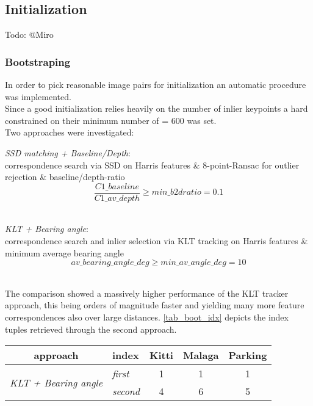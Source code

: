 \subsection{Initialization}
\label{sec_init}
Todo: @Miro

\subsubsection{Bootstraping}
In order to pick reasonable image pairs for initialization an automatic procedure was implemented.\\
Since a good initialization relies heavily on the number of inlier keypoints a hard constrained on their minimum number of  = $600$ was set.\\

Two approaches were investigated:
\begin{compactitem}
	\item \textit{SSD matching + Baseline/Depth}:\\
	correspondence search via SSD on Harris features \& 8-point-Ransac for outlier rejection \& baseline/depth-ratio\\
	\begin{equation}
		\frac{C1\_baseline}{C1\_av\_depth} \geqslant min\_b2dratio = 0.1
	\end{equation}\\
	
	\item \textit{KLT + Bearing angle}:\\
	correspondence search and inlier selection via KLT tracking on Harris features \& minimum average bearing angle\\
	\begin{equation}
		av\_bearing\_angle\_deg \geqslant min\_av\_angle\_deg = 10
	\end{equation}\\

\end{compactitem}

The comparison showed a massively higher performance of the KLT tracker approach, this being orders of magnitude faster and yielding many more feature correspondences also over large distances. \cref{tab_boot_idx} depicts the index tuples retrieved through the second approach.
\begin{center}
	\begin{tabular}{ c | l | c  c  c }
		approach &				index &				Kitti &		Malaga &	Parking\\
  		\hline
 \multirow{2}{*}{\textit{KLT + Bearing angle}} &	\textit{first} &	1 & 		1 & 		1\\
  		 & 						\textit{second} &	4 & 		6 & 		5\\
  		\hline  
	\end{tabular}
	\label{tab_boot_idx}
\end{center}


